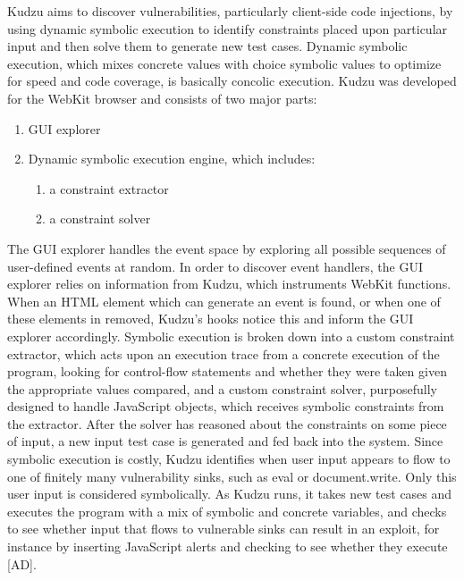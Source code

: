 \documentclass[11pt,expanded,copyright]{fsuthesis}
\begin{document}
Kudzu aims to discover vulnerabilities, particularly client-side code injections, by using dynamic symbolic execution to identify constraints placed upon particular input and then solve them to generate new test cases. Dynamic symbolic execution, which mixes concrete values with choice symbolic values to optimize for speed and code coverage, is basically concolic execution. Kudzu was developed for the WebKit browser and consists of two major parts:
\begin{enumerate}
	\item GUI explorer
	\item Dynamic symbolic execution engine, which includes:
	\begin{enumerate}
		\item a constraint extractor
		\item a constraint solver
	\end{enumerate}
\end{enumerate}

The GUI explorer handles the event space by exploring all possible sequences of user-defined events at random. In order to discover event handlers, the GUI explorer relies on information from Kudzu, which instruments WebKit functions. When an HTML element which can generate an event is found, or when one of these elements in removed, Kudzu's hooks notice this and inform the GUI explorer accordingly. Symbolic execution is broken down into a custom constraint extractor, which acts upon an execution trace from a concrete execution of the program, looking for control-flow statements and whether they were taken given the appropriate values compared, and a custom constraint solver, purposefully designed to handle JavaScript objects, which receives symbolic constraints from the extractor. After the solver has reasoned about the constraints on some piece of input, a new input test case is generated and fed back into the system. Since symbolic execution is costly, Kudzu identifies when user input appears to flow to one of finitely many vulnerability sinks, such as eval or document.write. Only this user input is considered symbolically. As Kudzu runs, it takes new test cases and executes the program with a mix of symbolic and concrete variables, and checks to see whether input that flows to vulnerable sinks can result in an exploit, for instance by inserting JavaScript alerts and checking to see whether they execute [AD].
\end{document}
